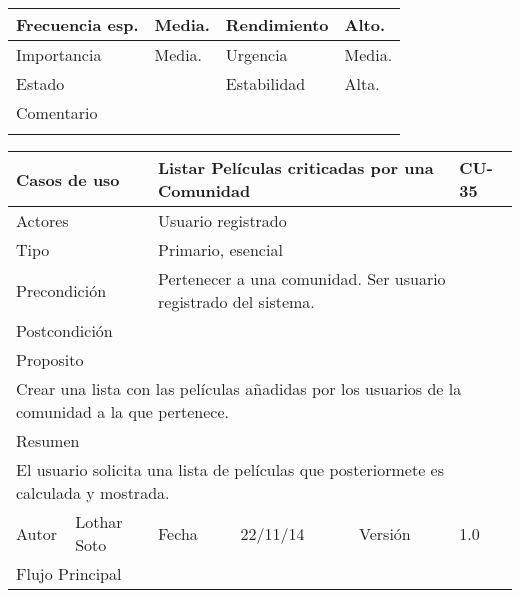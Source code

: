 \documentclass{article}
\begin{document}
\begin{table}[h]
\begin{tabular}{|l|l|l|l|l|l|}
\hline
\multicolumn{1}{|p{2cm}|}{Frecuencia esp.} & \multicolumn{2}{p{3cm}}{Media.} & \multicolumn{1}{|p{2cm}|}{Rendimiento} & \multicolumn{2}{p{3cm}|}{Alto.}\\
\hline
\multicolumn{1}{|p{2cm}|}{Importancia} & \multicolumn{2}{p{3cm}}{Media.} & \multicolumn{1}{|p{2cm}|}{Urgencia} & \multicolumn{2}{p{3cm}|}{Media.}\\
\hline
\multicolumn{1}{|p{2cm}|}{Estado} & \multicolumn{2}{p{3cm}}{} & \multicolumn{1}{|p{2cm}|}{Estabilidad} & \multicolumn{2}{p{3cm}|}{Alta.}\\
\hline
\multicolumn{6}{|p{10cm}|}{Comentario}\\
\hline
\multicolumn{6}{|p{10cm}|}{}\\
\hline
\end{tabular}
\end{table}
\begin{table}[h]
\begin{tabular}{|l|l|l|l|l|l|}
\hline
\multicolumn{2}{|p{2cm}|}{Casos de uso}  & \multicolumn{3}{p{7cm}|}{Listar Películas criticadas por una Comunidad} & CU-35 \\
\hline
\multicolumn{2}{|p{2cm}|}{Actores}       & \multicolumn{4}{p{8cm}|}{Usuario registrado}        \\
\hline
\multicolumn{2}{|p{2cm}|}{Tipo}          & \multicolumn{4}{p{8cm}|}{Primario, esencial}        \\
\hline
\multicolumn{2}{|p{2cm}|}{Precondición}  & \multicolumn{4}{p{8cm}|}{Pertenecer a una comunidad. Ser usuario registrado del sistema.}        \\
\hline
\multicolumn{2}{|p{2cm}|}{Postcondición} & \multicolumn{4}{p{8cm}|}{}        \\
\hline
\multicolumn{6}{|p{10cm}|}{Proposito}                                   \\
\hline
\multicolumn{6}{|p{10cm}|}{Crear una lista con las películas añadidas por los usuarios de la comunidad a la que pertenece.}                                            \\
\hline
\multicolumn{6}{|p{10cm}|}{Resumen}                                 \\
\hline
\multicolumn{6}{|p{10cm}|}{El usuario solicita una lista de películas que posteriormete es calculada y mostrada.}                                            \\
\hline
Autor         &       Lothar Soto        &  Fecha   &  22/11/14   &   Versión  & 1.0\\
\hline
\multicolumn{6}{|p{10cm}|}{Flujo Principal}\\

\end{tabular}
\end{table}
\end{document}
